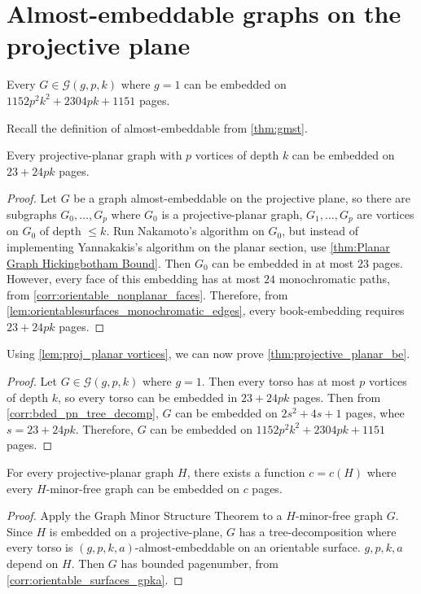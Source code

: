 
\section{Almost-embeddable graphs on the projective plane}

\begin{theorem}\label{thm:projective_planar_be}
	Every $G \in \mathcal{G}(g, p, k)$ where $g = 1$ can be embedded on $1152p^2 k^2 + 2304 pk + 1151$ pages.
\end{theorem}
Recall the definition of almost-embeddable from \cref{thm:gmst}. 
\begin{lemma}\label{lem:proj_planar vortices}
	Every projective-planar graph with $p$ vortices of depth $k$ can be embedded on $23 + 24pk$ pages.
\end{lemma}
\begin{proof}
	Let $G$ be a graph almost-embeddable on the projective plane, so there are subgraphs $G_0, \ldots, G_p$ where $G_0$ is a projective-planar graph, $G_1, \ldots, G_p$ are vortices on $G_0$ of depth $\leq k$. 
	Run Nakamoto's algorithm on $G_0$, but instead of implementing Yannakakis's algorithm on the planar section, use \cref{thm:Planar Graph Hickingbotham Bound}. Then $G_0$ can be embedded in at most $23$ pages. However, every face of this embedding has at most $24$ monochromatic paths, from \cref{corr:orientable_nonplanar_faces}. Therefore, from \cref{lem:orientablesurfaces_monochromatic_edges}, every book-embedding requires $23 + 24pk$ pages.
\end{proof}

Using \cref{lem:proj_planar vortices}, we can now prove \cref{thm:projective_planar_be}.
\begin{proof}
	Let $G \in \mathcal{G}(g, p, k)$ where $g = 1$. Then every torso has at most $p$ vortices of depth $k$, so every torso can be embedded in $23 + 24 pk$ pages. Then from \cref{corr:bded_pn_tree_decomp}, $G$ can be embedded on $2s^2 + 4s + 1$ pages, whee $s = 23 + 24pk$. Therefore, $G$ can be embedded on $1152p^2 k^2 + 2304 pk + 1151$ pages.
\end{proof}

\begin{proposition}
	For every projective-planar graph $H$, there exists a function $c = c(H)$ where every $H$-minor-free graph can be embedded on $c$ pages. 
\end{proposition}
\begin{proof}
	Apply the Graph Minor Structure Theorem to a $H$-minor-free graph $G$. Since $H$ is embedded on a projective-plane, $G$ has a tree-decomposition where every torso is $(g,p,k,a)$-almost-embeddable on an orientable surface. $g, p, k,a$ depend on $H$. Then $G$ has bounded pagenumber, from \cref{corr:orientable_surfaces_gpka}.
\end{proof}

